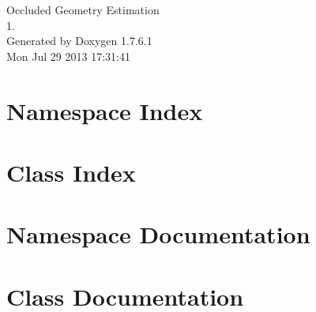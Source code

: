 \documentclass[a4paper]{book}
\begin{document}
\hypersetup{pageanchor=false,citecolor=blue}
\begin{titlepage}
\vspace*{7cm}
\begin{center}
{\Large \-Occluded \-Geometry \-Estimation \\[1ex]\large 1. }\\
\vspace*{1cm}
{\large \-Generated by Doxygen 1.7.6.1}\\
\vspace*{0.5cm}
{\small Mon Jul 29 2013 17:31:41}\\
\end{center}
\end{titlepage}
\clearemptydoublepage
{}
\tableofcontents
\clearemptydoublepage
{}
\hypersetup{pageanchor=true,citecolor=blue}
\chapter{\-Namespace \-Index}

\chapter{\-Class \-Index}

\chapter{\-Namespace \-Documentation}



\chapter{\-Class \-Documentation}














\printindex
\end{document}
